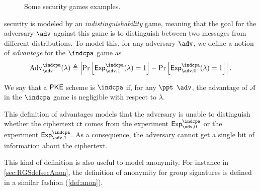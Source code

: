 \begin{figure}
  \centering
   \hspace{1cm}
  \caption{Some security games examples.} \label{fig:sec-game-examples}
\end{figure}

 
\indcpa{} security is modeled by an \emph{indistinguishability} game, meaning that the goal for the adversary $\adv$ against this game is to distinguish between two messages from different distributions.
To model this, for any adversary $\adv$, we define a notion of \emph{advantage} for the $\indcpa$ game as
\[
  \advantage{\indcpa}{\adv}(\lambda)
  \triangleq
  \left| \Pr\left[ \Exp{\indcpa}{\adv,1}(\lambda) = 1 \right] - \Pr\left[ \Exp{\indcpa}{\adv, 0}(\lambda) = 1\right] \right|.
\]

We say that a $\textsf{PKE}$ scheme is $\indcpa$ if, for any $\ppt$ $\adv$, the advantage of $\mathcal{A}$ in the $\indcpa$ game is negligible with respect to $\lambda$.

This definition of advantages models that the adversary is unable to distinguish whether the ciphertext $\mathsf{ct}$ comes from the experiment $\Exp{\indcpa}{\adv, 0}$ or the experiment $\Exp{\indcpa}{\adv, 1}$.
As a consequence, the adversary cannot get a single bit of information about the ciphertext.

This kind of definition is also useful to model anonymity.
For instance in \cref{sec:RGSdefsecAnon}, the definition of anonymity for group signatures is defined in a similar fashion (\cref{def:anon}).

